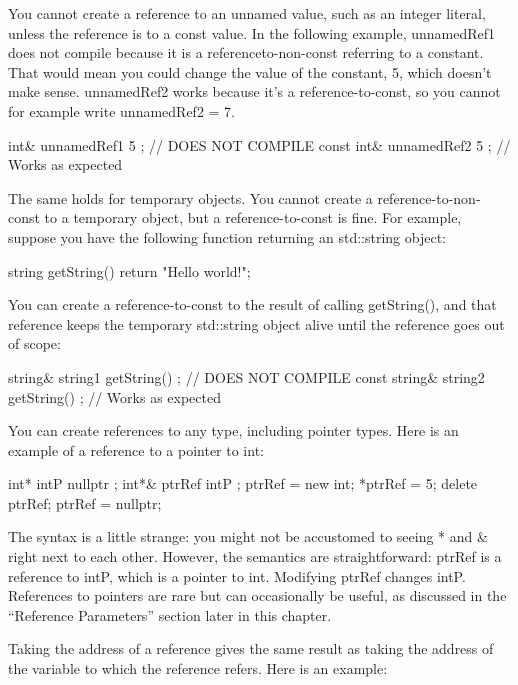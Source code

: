 You cannot create a reference to an unnamed value, such as an integer literal, unless the reference is to a const value. In the following example, unnamedRef1 does not compile because it is a referenceto-non-const referring to a constant. That would mean you could change the value of the constant, 5, which doesn’t make sense. unnamedRef2 works because it’s a reference-to-const, so you cannot for example write unnamedRef2 = 7.

\begin{cpp}
int& unnamedRef1 { 5 }; // DOES NOT COMPILE
const int& unnamedRef2 { 5 }; // Works as expected
\end{cpp}

The same holds for temporary objects. You cannot create a reference-to-non-const to a temporary object, but a reference-to-const is fine. For example, suppose you have the following function returning an std::string object:

\begin{cpp}
string getString() { return "Hello world!"; }
\end{cpp}

You can create a reference-to-const to the result of calling getString(), and that reference keeps the temporary std::string object alive until the reference goes out of scope:

\begin{cpp}
string& string1 { getString() }; // DOES NOT COMPILE
const string& string2 { getString() }; // Works as expected
\end{cpp}


You can create references to any type, including pointer types. Here is an example of a reference to a pointer to int:

\begin{cpp}
int* intP { nullptr };
int*& ptrRef { intP };
ptrRef = new int;
*ptrRef = 5;
delete ptrRef; ptrRef = nullptr;
\end{cpp}

The syntax is a little strange: you might not be accustomed to seeing * and \& right next to each other. However, the semantics are straightforward: ptrRef is a reference to intP, which is a pointer to int. Modifying ptrRef changes intP. References to pointers are rare but can occasionally be useful, as discussed in the “Reference Parameters” section later in this chapter.

Taking the address of a reference gives the same result as taking the address of the variable to which the reference refers. Here is an example:


